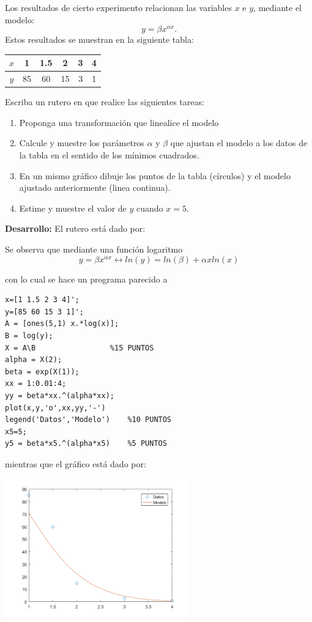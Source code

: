 Los resultados de cierto experimento relacionan las variables $x$ e $y$, mediante el modelo:
$$
y=\beta x^{\alpha x}.
$$
Estos resultados se muestran en la siguiente tabla:
\begin{center}
\begin{tabular}{c|ccccc}
$x$ & 1 & 1.5 & 2 & 3 & 4\\
\hline
$y$ & 85 & 60 & 15 & 3 & 1
\end{tabular}
\end{center}
Escriba un rutero en \matlab que realice las siguientes tareas:
\begin{enumerate}
\item Proponga una transformaci\'on que linealice el modelo

\respuesta{4cm}

\item Calcule y muestre los par\'ametros $\alpha$ y $\beta$ que ajustan el modelo a los datos de la tabla en el sentido de los m\'inimos cuadrados.
\item En un mismo gr\'afico dibuje los puntos de la tabla (c\'irculos) y el modelo ajustado anteriormente (linea continua).
\item Estime y muestre el valor de $y$ cuando $x=5$.
\end{enumerate}

\textbf{Desarrollo:} El rutero est\'a dado por:

Se observa que mediante una funci\'on logaritmo
$$
y=\beta x^{\alpha x} \leftrightarrow ln(y) =ln(\beta)+ \alpha x ln(x)
$$
\hfill\fbox{10pt}

con lo cual se hace un programa parecido a
\begin{lstlisting}
x=[1 1.5 2 3 4]';
y=[85 60 15 3 1]';
A = [ones(5,1) x.*log(x)];
B = log(y);
X = A\B					%15 PUNTOS
alpha = X(2);
beta = exp(X(1));
xx = 1:0.01:4;
yy = beta*xx.^(alpha*xx);
plot(x,y,'o',xx,yy,'-')
legend('Datos','Modelo') 	%10 PUNTOS
x5=5;
y5 = beta*x5.^(alpha*x5) 	%5 PUNTOS
\end{lstlisting}

mientras que el gr\'afico est\'a dado por:

\centerline{\includegraphics[width=0.6\textwidth]{mincuad.png}}
